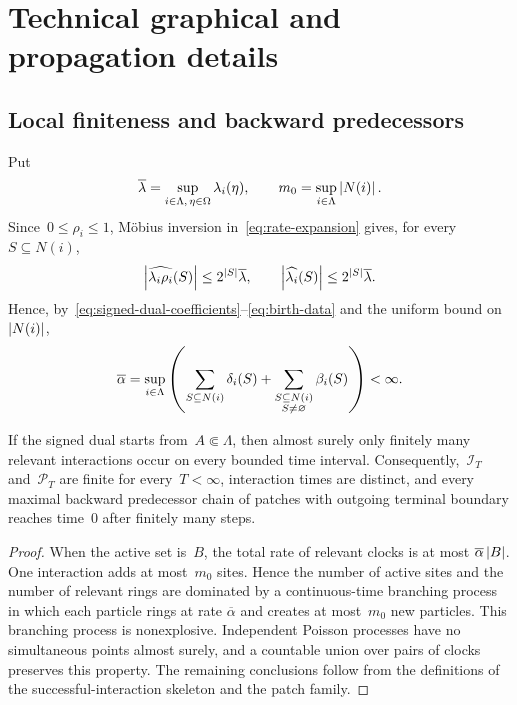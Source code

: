 \section{Technical graphical and propagation details}
\label{app:technical-background}

\subsection{Local finiteness and backward predecessors}
\label{app:local-finiteness}

Put
\begin{equation*}
\overline\lambda
=
\sup_{i\in\Lambda,\,\eta\in\Omega}\lambda_i(\eta),
\qquad
m_0=\sup_{i\in\Lambda}\left|N(i)\right|.
\end{equation*}
Since~$0\leq\rho_i\leq1$, M\"obius inversion in~\eqref{eq:rate-expansion}
gives, for every~$S\subseteq N(i)$,
\begin{equation*}
\left|\widehat{\lambda_i\rho_i}(S)\right|
\leq
2^{\left|S\right|}\overline\lambda,
\qquad
\left|\widehat{\lambda_i}(S)\right|
\leq
2^{\left|S\right|}\overline\lambda.
\end{equation*}
Hence, by~\eqref{eq:signed-dual-coefficients}--\eqref{eq:birth-data} and the
uniform bound on~$\left|N(i)\right|$,
\begin{equation*}
\overline\alpha
=
\sup_{i\in\Lambda}
\left(
 \sum_{S\subseteq N(i)}\delta_i(S)
 +
 \sum_{\substack{S\subseteq N(i)\\S\neq\varnothing}}\beta_i(S)
\right)
<\infty.
\end{equation*}

\begin{lemma}
\label{lem:appendix-dual-local-finiteness}
If the signed dual starts from~$A\Subset\Lambda$, then almost surely only
finitely many relevant interactions occur on every bounded time interval.
Consequently,~$\mathcal I_T$ and~$\mathcal P_T$ are finite for every~$T<\infty$,
interaction times are distinct, and every maximal backward predecessor chain
of patches with outgoing terminal boundary reaches time~$0$ after finitely many
steps.
\end{lemma}

\begin{proof}
When the active set is~$B$, the total rate of relevant clocks is at most
$\overline\alpha\left|B\right|$. One interaction adds at most~$m_0$ sites. Hence the
number of active sites and the number of relevant rings are dominated by a
continuous-time branching process in which each particle rings at rate
$\overline\alpha$ and creates at most~$m_0$ new particles. This branching
process is nonexplosive. Independent Poisson processes have no simultaneous
points almost surely, and a countable union over pairs of clocks preserves this
property. The remaining conclusions follow from the definitions of the
successful-interaction skeleton and the patch family.
\end{proof}

